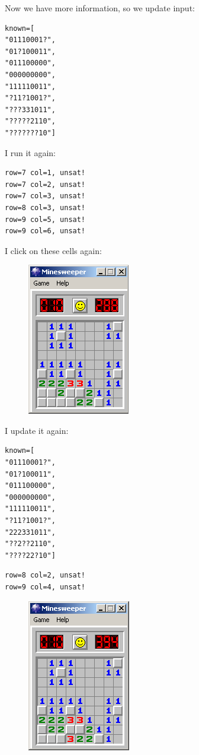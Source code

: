 Now we have more information, so we update input:

\begin{lstlisting}
known=[
"01110001?",
"01?100011",
"011100000",
"000000000",
"111110011",
"?11?1001?",
"???331011",
"?????2110",
"???????10"]
\end{lstlisting}

I run it again:

\begin{lstlisting}
row=7 col=1, unsat!
row=7 col=2, unsat!
row=7 col=3, unsat!
row=8 col=3, unsat!
row=9 col=5, unsat!
row=9 col=6, unsat!
\end{lstlisting}

I click on these cells again:

\begin{figure}[H]
\centering
\includegraphics[scale=0.75]{SMT/minesweeper/3.png}
\end{figure}

I update it again:

\begin{lstlisting}
known=[
"01110001?",
"01?100011",
"011100000",
"000000000",
"111110011",
"?11?1001?",
"222331011",
"??2??2110",
"????22?10"]
\end{lstlisting}

\begin{lstlisting}
row=8 col=2, unsat!
row=9 col=4, unsat!
\end{lstlisting}

\begin{figure}[H]
\centering
\includegraphics[scale=0.75]{SMT/minesweeper/4.png}
\end{figure}

